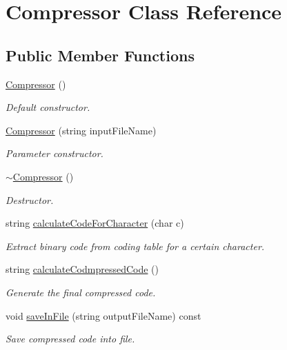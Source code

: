 \hypertarget{class_compressor}{}\section{Compressor Class Reference}
\label{class_compressor}
\subsection*{Public Member Functions}
\begin{DoxyCompactItemize}
\item 
\mbox{\label{class_compressor_a8a728ed1544cc0f82e8390f4606026b0}} 
\mbox{\hyperlink{class_compressor_a8a728ed1544cc0f82e8390f4606026b0}{Compressor}} ()
\begin{DoxyCompactList}\small\item\em Default constructor. \end{DoxyCompactList}\item 
\mbox{\hyperlink{class_compressor_a10146d317f26c60beef2a6ff88cd2b37}{Compressor}} (string input\+File\+Name)
\begin{DoxyCompactList}\small\item\em Parameter constructor. \end{DoxyCompactList}\item 
\mbox{\label{class_compressor_a7153be4a80054c7da7b355ff6841c0f7}} 
\mbox{\hyperlink{class_compressor_a7153be4a80054c7da7b355ff6841c0f7}{$\sim$\+Compressor}} ()
\begin{DoxyCompactList}\small\item\em Destructor. \end{DoxyCompactList}\item 
string \mbox{\hyperlink{class_compressor_a604328bbf5e70b07098547890a0963d8}{calculate\+Code\+For\+Character}} (char c)
\begin{DoxyCompactList}\small\item\em Extract binary code from coding table for a certain character. \end{DoxyCompactList}\item 
string \mbox{\hyperlink{class_compressor_a1973489d6ff8cff1458e9eff8dd0e556}{calculate\+Codmpressed\+Code}} ()
\begin{DoxyCompactList}\small\item\em Generate the final compressed code. \end{DoxyCompactList}\item 
void \mbox{\hyperlink{class_compressor_a462c120db290b92e49a566ada6ba6edf}{save\+In\+File}} (string output\+File\+Name) const
\begin{DoxyCompactList}\small\item\em Save compressed code into file. \end{DoxyCompactList}\end{DoxyCompactItemize}


